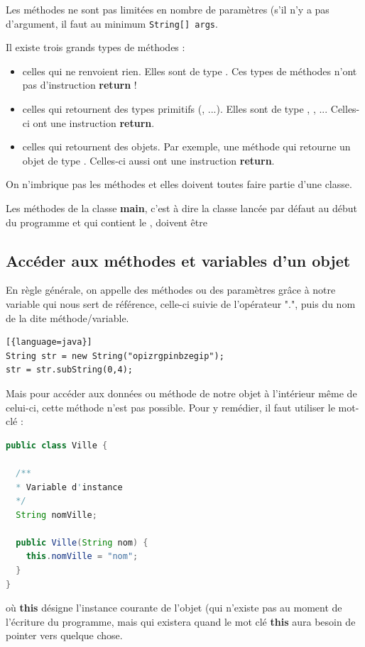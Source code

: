 \documentclass[a4paper,twoside]{article}
\begin{document}
Les méthodes ne sont pas limitées en nombre de paramètres (s'il n'y a pas d'argument, il faut au minimum \og \texttt{String[] args}\fg.

Il existe trois grands types de méthodes : 
\begin{itemize}
\item celles qui ne renvoient rien. Elles sont de type . Ces types de méthodes n'ont pas d'instruction \textbf{return} !
\item celles qui retournent des types primitifs (, ...). Elles sont de type , , ... Celles-ci ont une instruction \textbf{return}.
\item celles qui retournent des objets. Par exemple, une méthode qui retourne un objet de type . Celles-ci aussi ont une instruction \textbf{return}.
\end{itemize}

\bigskip

\begin{remarque}
On n'imbrique pas les méthodes et elles doivent toutes faire partie d'une classe. 
\end{remarque}

\begin{attention}
Les méthodes de la classe \textbf{main}, c'est à dire la classe lancée par défaut au début du programme et qui contient le , doivent être 
\end{attention}

\subsection{Accéder aux méthodes et variables d'un objet}
En règle générale, on appelle des méthodes ou des paramètres grâce à notre variable qui nous sert de référence, celle-ci suivie de l'opérateur ".", puis du nom de la dite méthode/variable.
\begin{lstlisting}[{language=java}]
String str = new String("opizrgpinbzegip");
str = str.subString(0,4);
\end{lstlisting}

Mais pour accéder aux données ou méthode de notre objet à l'intérieur même de celui-ci, cette méthode n'est pas possible. Pour y remédier, il faut utiliser le mot-clé  :
\begin{lstlisting}[language=java]
public class Ville {
  
  /**
  * Variable d'instance
  */
  String nomVille;
  
  public Ville(String nom) {
    this.nomVille = "nom";
  }
}
\end{lstlisting}
où \textbf{this} désigne l'instance courante de l'objet (qui n'existe pas au moment de l'écriture du programme, mais qui existera quand le mot clé \textbf{this} aura besoin de pointer vers quelque chose. 
\end{document}
